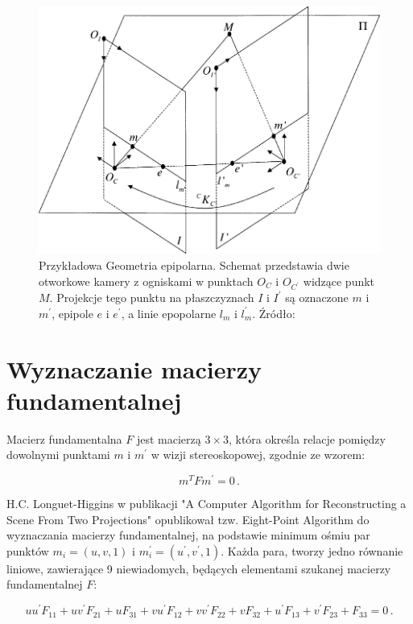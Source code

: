 \begin{figure}[h!] \centering
  \includegraphics[width=1\textwidth]{images/epipolar_geometry.png}
  \caption{Przykładowa Geometria epipolarna. Schemat przedstawia dwie otworkowe
  kamery z ogniskami w punktach $O_C$ i $O_{C^\prime}$ widzące punkt $M$.
  Projekcje tego punktu na płaszczyznach $I$ i $I^\prime$ są oznaczone $m$ i
  $m^\prime$, epipole $e$ i $e^\prime$, a linie epopolarne $l_{m}$ i
  $l_m^\prime$. Źródło: \cite{fm_overview} } \end{figure}

\section{Wyznaczanie macierzy fundamentalnej}

Macierz fundamentalna $F$ jest macierzą $3 \times 3$, która określa relacje
pomiędzy dowolnymi punktami $m$ i $m^\prime$ w wizji stereoskopowej, zgodnie ze
wzorem: 

\begin{equation}
  m^TFm^\prime = 0\,.
\end{equation}

H.C. Longuet-Higgins w publikacji "A Computer Algorithm for Reconstructing a
Scene From Two Projections" \cite{eight_point} opublikował tzw.  Eight-Point
Algorithm do wyznaczania macierzy fundamentalnej, na podstawie minimum ośmiu
par punktów $m_i=(u,v,1)$ i $m_i^\prime=(u^\prime,v^\prime,1)$.  Każda para,
tworzy jedno równanie liniowe, zawierające 9 niewiadomych, będących elementami
szukanej macierzy fundamentalnej $F$: 

\begin{equation} uu^\prime F_{11} + uv^\prime F_{21} + uF_{31} + vu^\prime
  F_{12} + vv^\prime F_{22} + vF_{32} + u^\prime F_{13} + v^\prime F_{23} +
  F_{33} = 0\,.  \end{equation}

